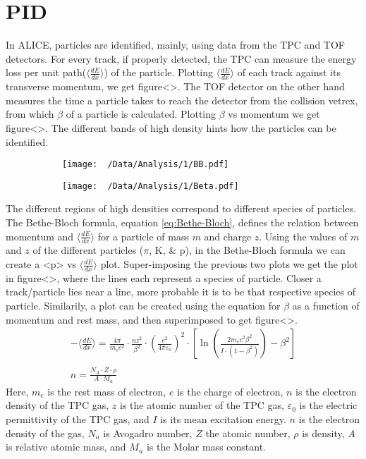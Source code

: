\documentclass[12pt,a4paper,twoside]{report}
\begin{document}
\section{PID}
In ALICE, particles are identified, mainly, using data from the TPC and TOF detectors. For every track, if properly detected, the TPC can measure the energy loss per unit path($\langle{ \frac{dE}{dx}}\rangle$) of the particle. Plotting $\langle{ \frac{dE}{dx}}\rangle$ of each track against its transverse momentum, we get figure<>. The TOF detector on the other hand measures the time a particle takes to reach the detector from the collision vetrex, from which $\beta$ of a particle is calculated. Plotting $\beta$ vs momentum we get figure<>. The different bands of high density hints how the particles can be identified.\\
\begin{figure}[H]
	\begin{subfigure}{0.49\linewidth}
		\texttt{[image: ~/Data/Analysis/1/BB.pdf]}
	\end{subfigure}
	\begin{subfigure}{0.49\linewidth}
		\texttt{[image: ~/Data/Analysis/1/Beta.pdf]}
	\end{subfigure}
\end{figure}
The different regions of high densities correspond to different species of particles. The Bethe-Bloch formula, equation \ref{eq:Bethe-Bloch}, defines the relation between momentum and $\langle{ \frac{dE}{dx}}\rangle$ for a particle of mass $m$ and charge $z$. Using the values of $m$ and $z$ of the different particles ($\pi$, K, \& p), in the Bethe-Bloch formula we can create a <p> vs $\langle{ \frac{dE}{dx}}\rangle$ plot. Super-imposing the previous two plots we get the plot in figure<>, where the lines each represent a species of particle. Closer a track/particle lies near a line, more probable it is to be that respective species of particle. Similarily, a plot can be created using the equation for $\beta$ as a function of momentum and rest mass, and then superimposed to get figure<>.
\begin{align}\label{eq:Bethe-Bloch}
	-\langle\frac{dE}{dx}\rangle=\frac{4\pi}{m_{e}c^2}\cdot\frac{nz^2}{\beta^2}\cdot(\frac{e^2}{4\pi\varepsilon_0})^2\cdot[\ln(\frac{2m_ec^2\beta^2}{I\cdot(1-\beta^2)})-\beta^2]
	\\\nonumber\\\nonumber
	n=\frac{N_A\cdot Z\cdot\rho}{A\cdot M_u}
\end{align}
Here, $m_e$ is the rest mass of electron, $e$ is the charge of electron,  $n$ is the electron density of the TPC gas, $z$ is the atomic number of the TPC gas, $\varepsilon_0$ is the electric permittivity of the TPC gas, and $I$ is its mean excitation energy. $n$ is the electron density of the gas, $N_a$ is Avogadro number, $Z$ the atomic number, $\rho$ is density, $A$ is relative atomic mass, and $M_u$ is the Molar mass constant.
\end{document}
